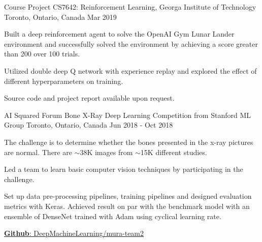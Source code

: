 

\begin{cventries}

  \cventry
    {Course Project} %
    {CS7642: Reinforcement Learning, Georga Institute of Technology} %
    {Toronto, Ontario, Canada} %
    {Mar 2019} %
    {
      \begin{cvitems} %
        \item {Built a deep reinforcement agent to solve the OpenAI Gym Lunar Lander environment and successfully solved the environment by achieving a score greater than 200 over 100 trials.}
        \item {Utilized double deep Q network with experience replay and explored the effect of different hyperparameters on training.}
        \item {Source code and project report available upon request.}
      \end{cvitems}
    }

\end{cventries}

\begin{cventries}

  \cventry
    {AI Squared Forum} %
    {Bone X-Ray Deep Learning Competition from Stanford ML Group} %
    {Toronto, Ontario, Canada} %
    {Jun 2018 - Oct 2018} %
    {
      \begin{cvitems} %
        \item {The challenge is to determine whether the bones presented in the x-ray pictures are normal. There are $\sim$38K images from $\sim$15K different studies.}
        \item {Led a team to learn basic computer vision techniques by participating in the challenge.}
        \item {Set up data pre-processing pipelines, training pipelines and designed evaluation metrics with Keras. Achieved result on par with the benchmark model with an ensemble of DenseNet trained with Adam using cyclical learning rate.}
        \item \href{https://github.com/DeepMachineLearning/mura-team2}{\textbf{Github}: DeepMachineLearning/mura-team2}
      \end{cvitems}
    }

\end{cventries}


